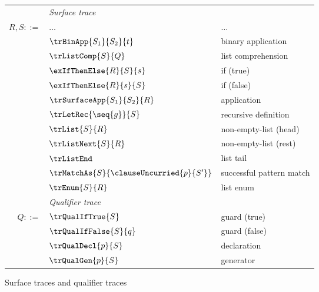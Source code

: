 \begin{figure}
   \begin{minipage}[t]{0.52\textwidth}
      \begin{tabularx}{\textwidth}{rL{2.8cm}L{3.4cm}}
         &\textit{Surface trace}&
         \\
         $R, S ::=$
         &
         $\dots$
         &
         $\dots$
         \\
         &
         $\trBinApp{S_1}{S_2}{t}$
         &
         binary application
         \\
         &
         $\trListComp{S}{Q}$
         &
         list comprehension
         \\
         &
         $\exIfThenElse{R}{S}{s}$
         &
         if (true)
         \\
         &
         $\exIfThenElse{R}{s}{S}$
         &
         if (false)
         \\
         &
         $\trSurfaceApp{S_1}{S_2}{R}$
         &
         application
         \\
         &
         $\trLetRec{\seq{g}}{S}$
         &
         recursive definition
         \\
         &
         $\trList{S}{R}$
         &
         non-empty-list (head)
         \\
         &
         $\trListNext{S}{R}$
         &
         non-empty-list (rest)
         \\
         &
         $\trListEnd$
         &
         list tail
         \\
         &
         $\trMatchAs{S}{\clauseUncurried{p}{S'}}$
         &
         successful pattern match
         \\
         &
         $\trEnum{S}{R}$
         &
         list enum
         \\[2mm]
         &\textit{Qualifier trace}&
         \\
         $Q ::=$
         &
         $\trQualIfTrue{S}$
         &
         guard (true)
         \\
         &
         $\trQualIfFalse{S}{q}$
         &
         guard (false)
         \\
         &
         $\trQualDecl{p}{S}$
         &
         declaration
         \\
         &
         $\trQualGen{p}{S}$
         &
         generator
         \\[2mm]

      \end{tabularx}
   \end{minipage}%
   \caption{Surface traces and qualifier traces}
\end{figure}
